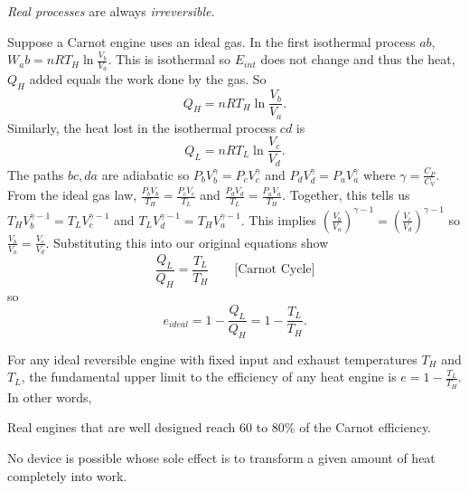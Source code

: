 \begin{remark}
    \emph{Real processes} are always \emph{irreversible}.
\end{remark}
\begin{remark}
    Suppose a Carnot engine uses an ideal gas. In the first isothermal process $ab$, $W_ab = nRT_H\ln\frac{V_b}{V_a}$. This is isothermal so $E_{int}$ does not change and thus the heat, $Q_H$ added equals the work done by the gas. So $$Q_H = nRT_H \ln\frac{V_b}{V_a}.$$ Similarly, the heat lost in the isothermal process $cd$ is $$Q_L = nRT_L \ln\frac{V_c}{V_d}.$$ The paths $bc, da$ are adiabatic so $P_bV_b^{\gamma} = P_cV_c^{\gamma}$ and $P_dV_d^{\gamma} = P_aV_a^{\gamma}$ where $\gamma = \frac{C_P}{C_V}.$ From the ideal gas law, $\frac{P_bV_b}{T_H} = \frac{P_cV_c}{T_L}$ and $\frac{P_dV_d}{T_L} = \frac{P_aV_a}{T_H}.$ Together, this tells us $T_HV_b^{\gamma - 1} = T_LV_c^{\gamma - 1}$ and $T_LV_d^{\gamma - 1} = T_HV_a^{\gamma - 1}$. This implies $(\frac{V_b}{V_a})^{\gamma - 1} = (\frac{V_c}{V_d})^{\gamma - 1}$ so $\frac{V_b}{V_a}=\frac{V_c}{V_d}$. Substituting this into our original equations show $$\frac{Q_L}{Q_H} = \frac{T_L}{T_H} \quad\quad \text{[Carnot Cycle]}$$ so $$e_{ideal} = 1 - \frac{Q_L}{Q_H} = 1 - \frac{T_L}{T_H}.$$ 
\end{remark}
\begin{theorem}
    For any ideal reversible engine with fixed input and exhaust temperatures $T_H$ and $T_L$, the fundamental upper limit to the efficiency of any heat engine is $e = 1-\frac{T_L}{T_H}$. In other words,
\end{theorem}
\begin{note}
    Real engines that are well designed reach 60 to 80\% of the Carnot efficiency.
\end{note}
\begin{definition}
    No device is possible whose sole effect is to transform a given amount of heat completely into work.
\end{definition}